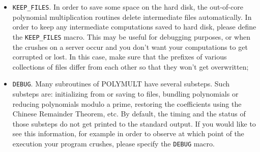 \documentclass[a4paper,10pt]{article}
\newcommand{\code}{\lstinline}
\begin{document}
\begin{itemize}
\item \code{KEEP_FILES}. In order to save some space on the hard disk, the out-of-core polynomial multiplication routines delete intermediate files automatically. In order to keep any intermediate computations saved to hard disk, please define the \code{KEEP_FILES} macro. This may be useful for debugging purposes, or when the crushes on a server occur and you don't want your computations to get corrupted or lost. In this case, make sure that the prefixes of various collections of files differ from each other so that they won't get overwritten;

\item \code{DEBUG}. Many subroutines of POLYMULT have several substeps. Such substeps are: initializing from or saving to files, bundling polynomials or reducing polynomials modulo a prime, restoring the coefficients using the Chinese Remainder Theorem, etc. By default, the timing and the status of those substeps do not get printed to the standard output. If you would like to see this information, for example in order to observe at which point of the execution your program crushes, please specify the \code{DEBUG} macro.
\end{itemize}





%
%
%
%
%
%
%
\end{document}
